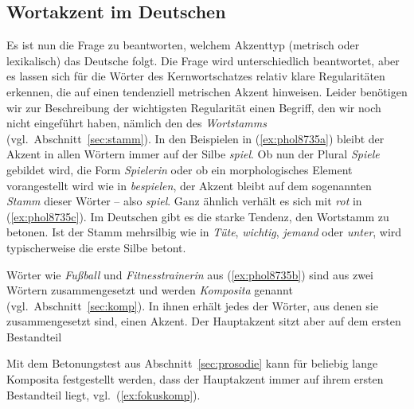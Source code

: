 \subsection{Wortakzent im Deutschen}

\label{sec:wortakzentimdeutschen}

Es ist nun die Frage zu beantworten, welchem Akzenttyp (metrisch oder lexikalisch) das Deutsche folgt.
Die Frage wird unterschiedlich beantwortet, aber es lassen sich für die Wörter des Kernwortschatzes relativ klare Regularitäten erkennen, die auf einen tendenziell metrischen Akzent hinweisen.
Leider benötigen wir zur Beschreibung der wichtigsten Regularität einen Begriff, den wir noch nicht eingeführt haben, nämlich den des \label{abs:3453457}\textit{Wortstamms} (vgl.\ Abschnitt~\ref{sec:stamm}).
In den Beispielen in (\ref{ex:phol8735a}) bleibt der Akzent in allen Wörtern immer auf der Silbe \textit{spiel}.
Ob nun der Plural \textit{Spiele} gebildet wird, die Form \textit{Spielerin} oder ob ein morphologisches Element vorangestellt wird wie in \textit{bespielen}, der Akzent bleibt auf dem sogenannten \textit{Stamm} dieser Wörter -- also \textit{spiel}.
Ganz ähnlich verhält es sich mit \textit{rot} in (\ref{ex:phol8735c}).
Im Deutschen gibt es die starke Tendenz, den Wortstamm zu betonen.
Ist der Stamm mehrsilbig wie in \textit{Tüte}, \textit{wichtig}, \textit{jemand} oder \textit{unter}, wird typischerweise die erste Silbe betont.


Wörter wie \textit{Fußball} und \textit{Fitnesstrainerin} aus (\ref{ex:phol8735b}) sind aus zwei Wörtern zusammengesetzt und werden \textit{Komposita} genannt (vgl.\ Abschnitt~\ref{sec:komp}).
In ihnen erhält jedes der Wörter, aus denen sie zusammengesetzt sind, einen Akzent.
Der Hauptakzent sitzt aber auf dem ersten Bestandteil


Mit dem Betonungstest aus Abschnitt~\ref{sec:prosodie} kann für beliebig lange Komposita festgestellt werden, dass der Hauptakzent immer auf ihrem ersten Bestandteil liegt, vgl.\ (\ref{ex:fokuskomp}).

